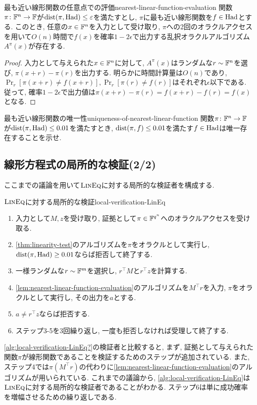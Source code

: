   \begin{lemma}{最も近い線形関数の任意点での評価}{nearest-linear-function-evaluation}
    関数$\pi\colon\mathbb{F}^n\to\mathbb{F}$が$\mathrm{dist}(\pi,\mathrm{Had})\le \varepsilon$を満たすとし,
    $\pi$に最も近い線形関数を$f\in\mathrm{Had}$とする.
    このとき, 任意の$x\in\mathbb{F}^n$を入力として受け取り, $\pi$への2回のオラクルアクセスを用いて$O(n)$時間で$f(x)$を確率$1-2\epsilon$で出力する乱択オラクルアルゴリズム$A^\pi(x)$が存在する.
  \end{lemma}
  \begin{proof}
    入力として与えられた$x\in\mathbb{F}^n$に対して, $A^\pi(x)$はランダムな$r\sim\mathbb{F}^n$を選び, $\pi(x+r)-\pi(r)$を出力する.
    明らかに時間計算量は$O(n)$であり, $\Pr_r[\pi(x+r)\ne f(x+r)], \Pr_r[\pi(r)\ne f(r)]$はそれぞれ$\epsilon$以下である.
    従って, 確率$1-2\epsilon$で出力値は$\pi(x+r)-\pi(r)=f(x+r)-f(r)=f(x)$となる.
  \end{proof}
  
  \begin{exercise}{最も近い線形関数の唯一性}{uniqueness-of-nearest-linear-function}
  関数$\pi\colon\mathbb{F}^n\to \mathbb{F}$が$\mathrm{dist}(\pi,\mathrm{Had}) \le 0.01$を満たすとき,
  $\mathrm{dist}(\pi,f)\le 0.01$を満たす$f\in\mathrm{Had}$は唯一存在することを示せ.
  \end{exercise}


\subsection{線形方程式の局所的な検証(2/2)}
ここまでの議論を用いて$\textsc{LinEq}$に対する局所的な検証者を構成する.
\begin{algorithm}{$\textsc{LinEq}$に対する局所的な検証}{local-verification-LinEq}
  \begin{enumerate}
    \item 入力として$M,z$を受け取り, 証拠として$\pi \in \mathbb{F}^{q^n}$へのオラクルアクセスを受け取る.
    \item \cref{thm:linearity-test}のアルゴリズムを$\pi$をオラクルとして実行し, $\mathrm{dist}(\pi,\mathrm{Had})\ge 0.01$ならば拒否して終了する.
    \item 一様ランダムな$r\sim\mathbb{F}^m$を選択し, $r^\top M$と$r^\top z$を計算する.
    \item \cref{lem:nearest-linear-function-evaluation}のアルゴリズムを$M^\top r$を入力, $\pi$をオラクルとして実行し, その出力を$a$とする.
    \item $a\ne r^\top z$ならば拒否する.
    \item ステップ3-5を3回繰り返し, 一度も拒否しなければ受理して終了する.
  \end{enumerate}
\end{algorithm}
\cref{alg:local-verification-LinEq?}の検証者と比較すると,
まず, 証拠として与えられた関数$\pi$が線形関数であることを検証するためのステップが追加されている.
また, ステップ4では$\pi(M^\top r)$の代わりに\cref{lem:nearest-linear-function-evaluation}のアルゴリズムが用いられている.
これまでの議論から, \cref{alg:local-verification-LinEq}は$\textsc{LinEq}$に対する局所的な検証者であることがわかる.
ステップ6は単に成功確率を増幅させるための繰り返しである.

